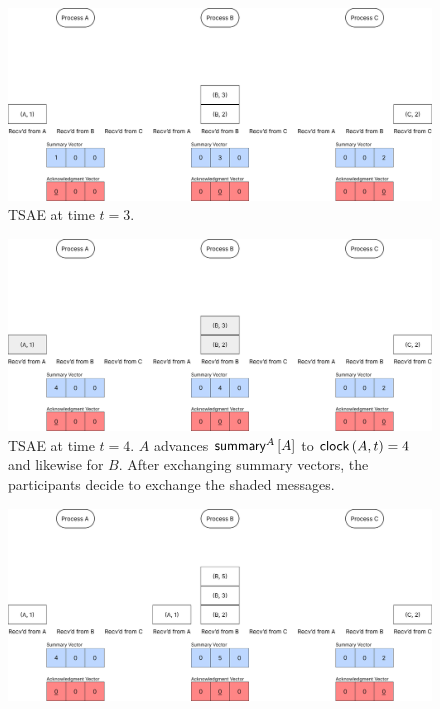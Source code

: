 \documentclass[]             %
{NASA}                       %
\theoremstyle{definition}
\begin{document}
\begin{landscape}
  \begin{figure}%
  \end{figure}
  \begin{figure}[h]
    \centering
    \includegraphics[width=1.4\textwidth]{images/tsaenew/TSAE3.png}
    \caption{TSAE at time $t=3$.}
    \label{fig:tsae1}
  \end{figure}
  \begin{figure}[h]
    \centering
    \includegraphics[width=1.4\textwidth]{images/tsaenew/TSAE4.png}
    \caption{TSAE at time $t=4$. $A$ advances $\mathsf{summary}^{A}\left[A\right]$ to $\mathsf{clock}\left(A, t\right) = 4$ and likewise for $B$. After exchanging summary vectors, the participants decide to exchange the shaded messages.}
    \label{fig:tsae2}
  \end{figure}
  \begin{figure}[h]
    \centering
    \includegraphics[width=1.4\textwidth]{images/tsaenew/TSAE5.png}

\end{figure}
\end{landscape}
\end{document}
